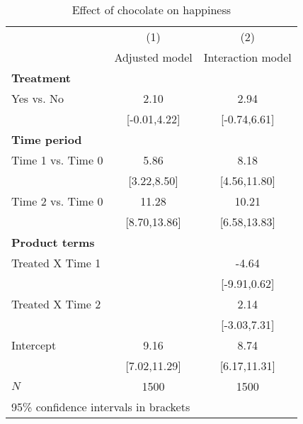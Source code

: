 \begin{table}[htbp]\centering
\caption{Effect of chocolate on happiness}
\begin{tabular}{l*{2}{c}}
\hline\hline
            &\multicolumn{1}{c}{(1)}&\multicolumn{1}{c}{(2)}\\
            &\multicolumn{1}{c}{Adjusted model}&\multicolumn{1}{c}{Interaction model}\\
\hline
\textbf{Treatment}&                      &                      \\
[1em]
Yes vs. No  &                  2.10&                  2.94\\
            &          [-0.01,4.22]&          [-0.74,6.61]\\
[1em]
\textbf{Time period}&                      &                      \\
[1em]
Time 1 vs. Time 0&                  5.86&                  8.18\\
            &           [3.22,8.50]&          [4.56,11.80]\\
[1em]
Time 2 vs. Time 0&                 11.28&                 10.21\\
            &          [8.70,13.86]&          [6.58,13.83]\\
[1em]
\textbf{Product terms}&                      &                      \\
[1em]
Treated X Time 1&                      &                 -4.64\\
            &                      &          [-9.91,0.62]\\
[1em]
Treated X Time 2&                      &                  2.14\\
            &                      &          [-3.03,7.31]\\
[1em]
Intercept   &                  9.16&                  8.74\\
            &          [7.02,11.29]&          [6.17,11.31]\\
\hline
\(N\)       &                  1500&                  1500\\
\hline\hline
\multicolumn{3}{l}{\footnotesize 95\% confidence intervals in brackets}\\
\end{tabular}
\end{table}
